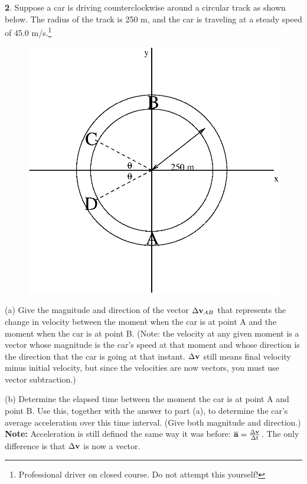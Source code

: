 \vfil\eject


{\bf 2}.  Suppose a car is driving counterclockwise around a circular track as shown
below.  The radius of the track is 250 m, and the car is traveling
at a steady speed of 45.0 m/s.\footnote{Professional driver on closed
course.  Do not attempt this yourself!}

\begin{figure}[h]
\centerline{\includegraphics{vectors/veclabfig.eps}}
\end{figure}

(a) Give the magnitude and direction of the vector $\Delta{\bf v}_{AB}$
that represents the change in velocity between the moment when the
car is at point A and the moment when the car is at point B.  (Note:
the velocity at any given moment is a vector whose magnitude is the
car's speed at that moment and whose direction is the direction that
the car is going at that instant.  $\Delta{\bf v}$ still means
final velocity minus initial velocity, but since the velocities are
now vectors, you must use vector subtraction.)

\vfil

(b) Determine the elapsed time between the moment the car is at point A
and point B.  Use this, together with the answer to part (a), to determine
the car's average acceleration over this time interval.  (Give both magnitude
and direction.)  {\bf Note:} Acceleration is still defined the same
way it was before: $\overline{\bf a}=\frac{\Delta \bf v}{\Delta t}$.
The only difference is that $\Delta{\bf v}$ is now a vector.


